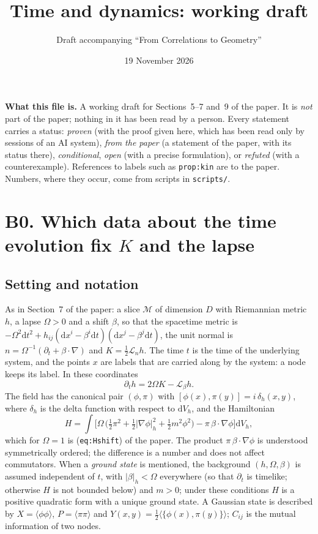 \documentclass[a4paper,11pt]{article}
\title{Time and dynamics: working draft}
\author{Draft accompanying ``From Correlations to Geometry''}
\date{19 November 2026}
\theoremstyle{definition}
\theoremstyle{remark}
\newcommand{\M}{\mathcal{M}}
\newcommand{\dd}{\mathrm{d}}
\newcommand{\Lie}{\mathcal{L}}
\begin{document}
\maketitle

\noindent\textbf{What this file is.} A working draft for Sections~5--7 and~9 of the paper. It is \emph{not} part of the paper; nothing in it has been read by a person. Every statement carries a status: \emph{proven} (with the proof given here, which has been read only by sessions of an AI system), \emph{from the paper} (a statement of the paper, with its status there), \emph{conditional}, \emph{open} (with a precise formulation), or \emph{refuted} (with a counterexample). References to labels such as \texttt{prop:kin} are to the paper. Numbers, where they occur, come from scripts in \texttt{scripts/}.

\tableofcontents

\section{B0. Which data about the time evolution fix $K$ and the lapse}

\subsection{Setting and notation}

As in Section~7 of the paper: a slice $\M$ of dimension $D$ with Riemannian metric $h$, a lapse $\Omega>0$ and a shift $\beta$, so that the spacetime metric is $-\Omega^2\dd t^2+h_{ij}(\dd x^i-\beta^i\dd t)(\dd x^j-\beta^j\dd t)$, the unit normal is $n=\Omega^{-1}(\partial_t+\beta\cdot\nabla)$ and $K=\tfrac12\Lie_nh$. The time $t$ is the time of the underlying system, and the points $x$ are labels that are carried along by the system: a node keeps its label. In these coordinates
\begin{equation}\label{eq:hdot}
\partial_th=2\Omega K-\Lie_\beta h .
\end{equation}
The field has the canonical pair $(\phi,\pi)$ with $[\phi(x),\pi(y)]=i\,\delta_h(x,y)$, where $\delta_h$ is the delta function with respect to $\dd V_h$, and the Hamiltonian
\begin{equation}\label{eq:H}
H=\int\Big[\Omega\,\big(\tfrac12\pi^2+\tfrac12|\nabla\phi|_h^2+\tfrac12m^2\phi^2\big)-\pi\,\beta\cdot\nabla\phi\Big]\dd V_h ,
\end{equation}
which for $\Omega=1$ is (\texttt{eq:Hshift}) of the paper. The product $\pi\,\beta\cdot\nabla\phi$ is understood symmetrically ordered; the difference is a number and does not affect commutators. When a \emph{ground state} is mentioned, the background $(h,\Omega,\beta)$ is assumed independent of $t$, with $|\beta|_h<\Omega$ everywhere (so that $\partial_t$ is timelike; otherwise $H$ is not bounded below) and $m>0$; under these conditions $H$ is a positive quadratic form with a unique ground state. A Gaussian state is described by $X=\langle\phi\phi\rangle$, $P=\langle\pi\pi\rangle$ and $Y(x,y)=\tfrac12\langle\{\phi(x),\pi(y)\}\rangle$; $C_{ij}$ is the mutual information of two nodes.
\end{document}
